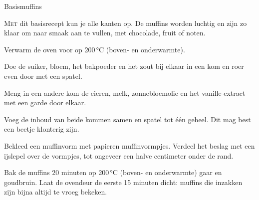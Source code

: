 \begin{recipe}{Basismuffins}


\lettrine{M}{et} dit basisrecept kun je alle kanten op. De muffins worden
luchtig en zijn zo klaar om naar smaak aan te vullen, met chocolade, fruit of
noten.

\begin{ingredients}
\end{ingredients}

\begin{steps}
  \item Verwarm de oven voor op 200\,°C (boven- en onderwarmte).
  \item Doe de suiker, bloem, het bakpoeder en het zout bij elkaar in een kom
        en roer even door met een spatel.
  \item Meng in een andere kom de eieren, melk, zonnebloemolie en het
        vanille-extract met een garde door elkaar.
  \item Voeg de inhoud van beide kommen samen en spatel tot één geheel. Dit
        mag best een beetje klonterig zijn.
  \item Bekleed een muffinvorm met papieren muffinvormpjes. Verdeel het
        beslag met een ijslepel over de vormpjes, tot ongeveer een halve
        centimeter onder de rand.
  \item Bak de muffins 20 minuten op 200\,°C (boven- en onderwarmte) gaar en
        goudbruin. Laat de ovendeur de eerste 15 minuten dicht: muffins die
        inzakken zijn bijna altijd te vroeg bekeken.
\end{steps}
\end{recipe}
